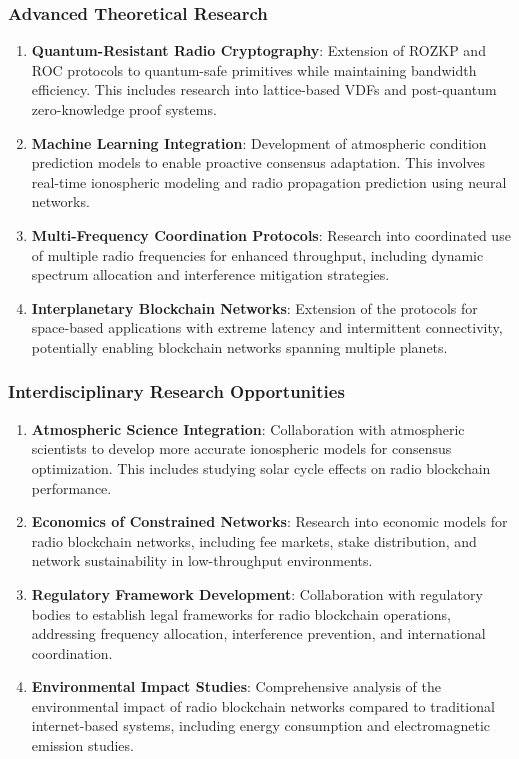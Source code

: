 \documentclass[11pt,a4paper]{article}
\begin{document}
\subsubsection{Advanced Theoretical Research}

\begin{enumerate}
\item \textbf{Quantum-Resistant Radio Cryptography}: Extension of ROZKP and ROC protocols to quantum-safe primitives while maintaining bandwidth efficiency. This includes research into lattice-based VDFs and post-quantum zero-knowledge proof systems.

\item \textbf{Machine Learning Integration}: Development of atmospheric condition prediction models to enable proactive consensus adaptation. This involves real-time ionospheric modeling and radio propagation prediction using neural networks.

\item \textbf{Multi-Frequency Coordination Protocols}: Research into coordinated use of multiple radio frequencies for enhanced throughput, including dynamic spectrum allocation and interference mitigation strategies.

\item \textbf{Interplanetary Blockchain Networks}: Extension of the protocols for space-based applications with extreme latency and intermittent connectivity, potentially enabling blockchain networks spanning multiple planets.
\end{enumerate}

\subsubsection{Interdisciplinary Research Opportunities}

\begin{enumerate}
\item \textbf{Atmospheric Science Integration}: Collaboration with atmospheric scientists to develop more accurate ionospheric models for consensus optimization. This includes studying solar cycle effects on radio blockchain performance.

\item \textbf{Economics of Constrained Networks}: Research into economic models for radio blockchain networks, including fee markets, stake distribution, and network sustainability in low-throughput environments.

\item \textbf{Regulatory Framework Development}: Collaboration with regulatory bodies to establish legal frameworks for radio blockchain operations, addressing frequency allocation, interference prevention, and international coordination.

\item \textbf{Environmental Impact Studies}: Comprehensive analysis of the environmental impact of radio blockchain networks compared to traditional internet-based systems, including energy consumption and electromagnetic emission studies.
\end{enumerate}
\end{document}

